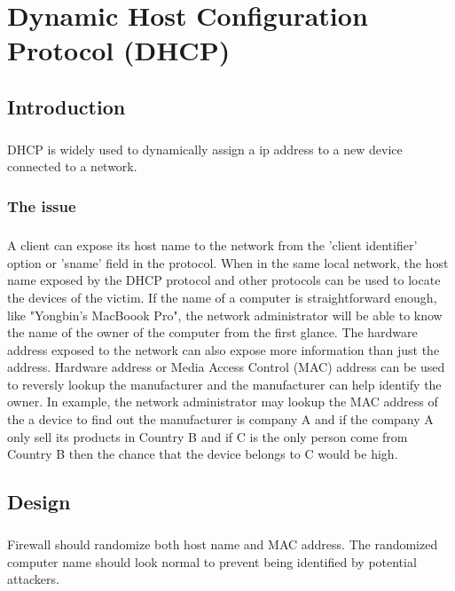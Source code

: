 \documentclass[mscthesis]{usiinfthesis}
\begin{document}
\chapter{Dynamic Host Configuration Protocol (DHCP)}

\section{Introduction}
\paragraph{}
DHCP is widely used to dynamically assign a ip address to a new device connected to a network.

\subsection{The issue}
\paragraph{}
A client can expose its host name to the network from the 'client identifier' option or 'sname' field in the protocol. When in the same local network, the host name exposed by the DHCP protocol and other protocols can be used to locate the devices of the victim. If the name of a computer is straightforward enough, like "Yongbin's MacBoook Pro", the network administrator will be able to know the name of the owner of the computer from the first glance. The hardware address exposed to the network can also expose more information than just the address. Hardware address or Media Access Control (MAC) address can be used to reversly lookup the manufacturer and the manufacturer can help identify the owner. In example, the network administrator may lookup the MAC address of the a device to find out the manufacturer is company A and if the company A only sell its products in Country B and if C is the only person come from Country B then the chance that the device belongs to C would be high.

\section{Design}
\paragraph{}
Firewall should randomize both host name and MAC address. The randomized computer name should look normal to prevent being identified by potential attackers.
\end{document}
